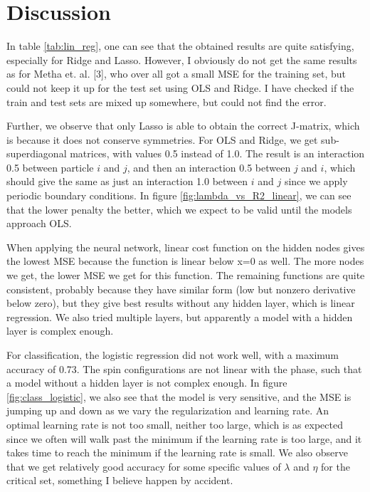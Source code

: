 \section{Discussion} \label{sec:discussion}
In table \eqref{tab:lin_reg}, one can see that the obtained results are quite satisfying, especially for Ridge and Lasso. However, I obviously do not get the same results as for Metha et. al. [3], who over all got a small MSE for the training set, but could not keep it up for the test set using OLS and Ridge. I have checked if the train and test sets are mixed up somewhere, but could not find the error.

Further, we observe that only Lasso is able to obtain the correct J-matrix, which is because it does not conserve symmetries. For OLS and Ridge, we get sub-superdiagonal matrices, with values 0.5 instead of 1.0. The result is an interaction 0.5 between particle $i$ and $j$, and then an interaction 0.5 between $j$ and $i$, which should give the same as just an interaction 1.0 between $i$ and $j$ since we apply periodic boundary conditions. In figure \eqref{fig:lambda_vs_R2_linear}, we can see that the lower penalty the better, which we expect to be valid until the models approach OLS. 

When applying the neural network, linear cost function on the hidden nodes gives the lowest MSE because the function is linear below x=0 as well. The more nodes we get, the lower MSE we get for this function. The remaining functions are quite consistent, probably because they have similar form (low but nonzero derivative below zero), but they give best results without any hidden layer, which is linear regression. We also tried multiple layers, but apparently a model with a hidden layer is complex enough.
\vspace{1cm}

For classification, the logistic regression did not work well, with a maximum accuracy of 0.73. The spin configurations are not linear with the phase, such that a model without a hidden layer is not complex enough. In figure \eqref{fig:class_logistic}, we also see that the model is very sensitive, and the MSE is jumping up and down as we vary the regularization and learning rate. An optimal learning rate is not too small, neither too large, which is as expected since we often will walk past the minimum if the learning rate is too large, and it takes time to reach the minimum if the learning rate is small. We also observe that we get relatively good accuracy for some specific values of $\lambda$ and $\eta$ for the critical set, something I believe happen by accident.

